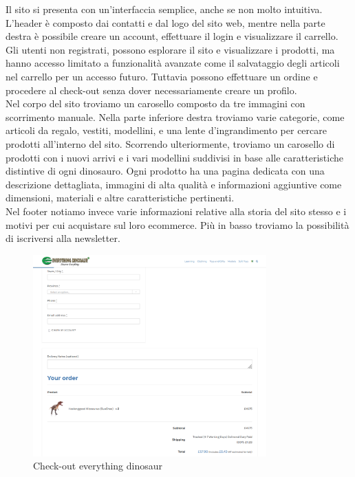 Il sito si presenta con un'interfaccia semplice, anche se non molto intuitiva. L'header è composto dai contatti e dal logo del sito web, mentre nella parte destra è possibile creare un account, effettuare il login e visualizzare il carrello. Gli utenti non registrati, possono esplorare il sito e visualizzare i prodotti, ma hanno accesso limitato a funzionalità avanzate come il salvataggio degli articoli nel carrello per un accesso futuro. Tuttavia possono effettuare un ordine e procedere al check-out senza dover necessariamente creare un profilo.
\\
Nel corpo del sito troviamo un carosello composto da tre immagini con scorrimento manuale. Nella parte inferiore destra troviamo varie categorie, come articoli da regalo, vestiti, modellini, e una lente d'ingrandimento per cercare prodotti all'interno del sito. Scorrendo ulteriormente, troviamo un carosello di prodotti con i nuovi arrivi e i vari modellini suddivisi in base alle caratteristiche distintive di ogni dinosauro. Ogni prodotto ha una pagina dedicata con una descrizione dettagliata, immagini di alta qualità e informazioni aggiuntive come dimensioni, materiali e altre caratteristiche pertinenti. 
\\
Nel footer notiamo invece varie informazioni relative alla storia del sito stesso e i motivi per cui acquistare sul loro ecommerce. Più in basso troviamo la possibilità di iscriversi alla newsletter. 

\begin{figure}[H]
        \centering
        \includegraphics[width=0.80\textwidth]{immagini/everything_dinosaur_checkout.png}
        \caption{Check-out everything dinosaur}
    \end{figure}
